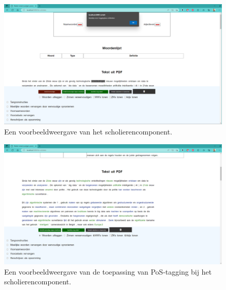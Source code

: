 \begin{center}
	\begin{figure}[H]
		\includegraphics[width=\linewidth]{img/proto-melding.png}
		\caption{Een voorbeeldweergave van het scholierencomponent.}
		\label{img:proto-homescreen-scholieren}
	\end{figure}
\end{center}

\begin{center}
	\begin{figure}[H]
		\includegraphics[width=\linewidth]{img/proto-pos-tagging.png}
		\caption{Een voorbeeldweergave van de toepassing van PoS-tagging bij het scholierencomponent.}
		\label{img:proto-pos-tagging-scholieren}
	\end{figure}
\end{center}

